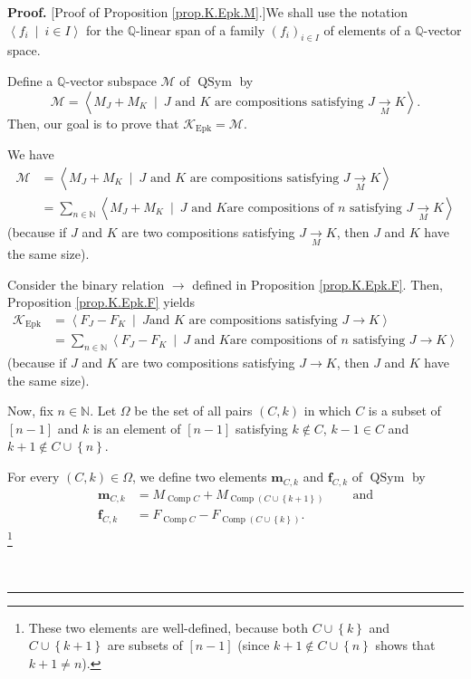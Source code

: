 \documentclass[numbers=enddot,12pt,final,onecolumn,notitlepage]{scrartcl}%
\theoremstyle{definition}
\newenvironment{proof}[1][Proof]{\noindent\textbf{#1.} }{\ \rule{0.5em}{0.5em}}
\newenvironment{verlong}{}{}
\let\sumnonlimits\sum
\renewcommand{\sum}{\sumnonlimits\limits}
\begin{document}
\begin{verlong}
\begin{proof}
[Proof of Proposition \ref{prop.K.Epk.M}.]We shall use the notation
$\left\langle f_{i}\ \mid\ i\in I\right\rangle $ for the $\mathbb{Q}$-linear
span of a family $\left(  f_{i}\right)  _{i\in I}$ of elements of a
$\mathbb{Q}$-vector space.

Define a $\mathbb{Q}$-vector subspace $\mathcal{M}$ of $\operatorname*{QSym}$
by%
\[
\mathcal{M}=\left\langle M_{J}+M_{K}\ \mid\ J\text{ and }K\text{ are
compositions satisfying }J\underset{M}{\rightarrow}K\right\rangle .
\]
Then, our goal is to prove that $\mathcal{K}_{\operatorname{Epk}}%
=\mathcal{M}$.

We have%
\begin{align*}
\mathcal{M}  &  =\left\langle M_{J}+M_{K}\ \mid\ J\text{ and }K\text{ are
compositions satisfying }J\underset{M}{\rightarrow}K\right\rangle \\
&  =\sum_{n\in\mathbb{N}}\left\langle M_{J}+M_{K}\ \mid\ J\text{ and }K\text{
are compositions of }n\text{ satisfying }J\underset{M}{\rightarrow
}K\right\rangle
\end{align*}
(because if $J$ and $K$ are two compositions satisfying
$J\underset{M}{\rightarrow}K$, then $J$ and $K$ have the same size).

Consider the binary relation $\rightarrow$ defined in Proposition
\ref{prop.K.Epk.F}. Then, Proposition \ref{prop.K.Epk.F} yields%
\begin{align*}
\mathcal{K}_{\operatorname{Epk}}  &  =\left\langle F_{J}-F_{K}\ \mid\ J\text{
and }K\text{ are compositions satisfying }J\rightarrow K\right\rangle \\
&  =\sum_{n\in\mathbb{N}}\left\langle F_{J}-F_{K}\ \mid\ J\text{ and }K\text{
are compositions of }n\text{ satisfying }J\rightarrow K\right\rangle
\end{align*}
(because if $J$ and $K$ are two compositions satisfying $J\rightarrow K$, then
$J$ and $K$ have the same size).

Now, fix $n\in\mathbb{N}$. Let $\Omega$ be the set of all pairs $\left(
C,k\right)  $ in which $C$ is a subset of $\left[  n-1\right]  $ and $k$ is an
element of $\left[  n-1\right]  $ satisfying $k\notin C$, $k-1\in C$ and
$k+1\notin C\cup\left\{  n\right\}  $.

For every $\left(  C,k\right)  \in\Omega$, we define two elements
$\mathbf{m}_{C,k}$ and $\mathbf{f}_{C,k}$ of $\operatorname*{QSym}$ by%
\begin{align}
\mathbf{m}_{C,k}  &  =M_{\operatorname*{Comp}C}+M_{\operatorname*{Comp}\left(
C\cup\left\{  k+1\right\}  \right)  }\ \ \ \ \ \ \ \ \ \ \text{and}%
\label{pf.prop.K.Epk.M.mCk=}\\
\mathbf{f}_{C,k}  &  =F_{\operatorname*{Comp}C}-F_{\operatorname*{Comp}\left(
C\cup\left\{  k\right\}  \right)  }. \label{pf.prop.K.Epk.M.fCk=}%
\end{align}
\footnote{These two elements are well-defined, because both $C\cup\left\{
k\right\}  $ and $C\cup\left\{  k+1\right\}  $ are subsets of $\left[
n-1\right]  $ (since $k+1\notin C\cup\left\{  n\right\}  $ shows that $k+1\neq
n$).}


\end{proof}
\end{verlong}
\end{document}
